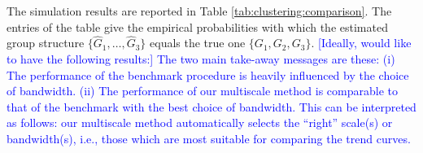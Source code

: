 \documentclass[12pt]{article}
\begin{document}
%
%
%
%
%


The simulation results are reported in Table \ref{tab:clustering:comparison}. The entries of the table give the empirical probabilities with which the estimated group structure $\{ \widehat{G}_1,\ldots,\widehat{G}_3\}$ equals the true one $\{G_1,G_2,G_3\}$.
\textcolor{blue}{[Ideally, would like to have the following results:]
The two main take-away messages are these:
(i) The performance of the benchmark procedure is heavily influenced by the choice of bandwidth.
(ii) The performance of our multiscale method is comparable to that of the benchmark with the best choice of bandwidth.
This can be interpreted as follows: our multiscale method automatically selects the ``right'' scale(s) or bandwidth(s), i.e., those which are most suitable for comparing the trend curves. }
\end{document}
